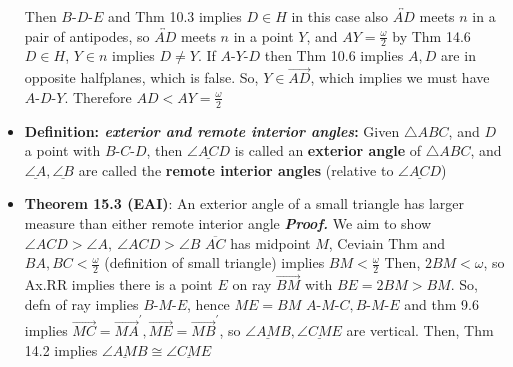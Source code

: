 \documentclass{report}
\begin{document}
\begin{itemize}
            \bigbreak \noindent 
            \bigbreak \noindent 
            Then $ B\text{-}D\text{-}E$ and Thm 10.3 implies $ D \in H$ in this case also
            \bigbreak \noindent 
            $ \overleftrightarrow{AD}$ meets $n$ in a pair of antipodes, so $\overleftrightarrow{AD}$ meets $n$ in a point $Y$, and $AY = \frac{\omega}{2}$ by Thm 14.6
            \bigbreak \noindent 
            $D \in H$, $Y \in n$ implies $D \ne Y$. If $ A\text{-}Y\text{-}D$ then Thm 10.6 implies $A,D$ are in opposite halfplanes, which is false.
            \bigbreak \noindent 
            So, $Y \in \overrightarrow{AD}$, which implies we must have $ A\text{-}D\text{-}Y$. Therefore $AD < AY = \frac{\omega}{2} $
            \bigbreak \noindent 
            \bigbreak \noindent 
            \endpf
        \item \textbf{Definition: \textit{exterior and remote interior angles}:} Given $ \triangle ABC$, and $D$ a point with $ B\text{-}C\text{-}D$, then $ \underline{\angle ACD} $ is called an \textbf{exterior angle} of $\triangle ABC$, and $ \underline{ \angle A}, \underline{ \angle B}$ are called the \textbf{remote interior angles} (relative to $ \underline{\angle ACD} $)
            \bigbreak \noindent 
        \item \textbf{Theorem 15.3 (EAI)}: An exterior angle of a small triangle has larger measure than either remote interior angle
            \bigbreak \noindent 
            \bigbreak \noindent 
            \textbf{\textit{Proof.}} We aim to show $ \angle ACD > \angle A,\ \angle ACD > \angle B $
            \bigbreak \noindent 
            $ \overline{AC}$ has midpoint $M$, Ceviain Thm and $BA,BC < \frac{\omega}{2}$ (definition of small triangle) implies $ BM < \frac{\omega}{2} $
            \bigbreak \noindent 
            Then, $2BM < \omega$, so Ax.RR implies there is a point $E$ on ray $\overrightarrow{BM}$ with $BE =  2BM > BM$. So, defn of ray implies $ B\text{-}M\text{-}E$, hence $ME = BM $
            \bigbreak \noindent 
            \bigbreak \noindent 
            \bigbreak \noindent 
            $ A\text{-}M\text{-}C, B\text{-}M\text{-}E$ and thm 9.6 implies $ \overrightarrow{MC} = \overrightarrow{MA}^{\prime}, \overrightarrow{ME} = \overrightarrow{MB}^{\prime}$, so $ \underline{\angle AMB}, \underline{\angle CME}$ are vertical. Then, Thm 14.2 implies $ \underline{\angle AMB} \cong \underline{\angle CME} $

\end{itemize}
\end{document}
